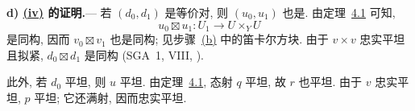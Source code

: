 \medskip
{}\label{par:sga3-V-6-d}%
\noindent\textbf{d) \hyperref[lem:sga3-V-6.1-iv]{(iv)} 的证明.}---%
若 \((d_0,d_1)\) 是等价对, 则 \((u_0,u_1)\) 也是.
由定理~\hyperref[thm:sga3-V-4.1]{4.1} 可知,
\[
  u_0\boxtimes u_1:U_1\longrightarrow U\times_Y U
\]
是同构, 因而 \(v_0\boxtimes v_1\) 也是同构;
见步骤~\hyperref[par:sga3-V-6-b]{(b)} 中的笛卡尔方块.
由于 \(v\times v\) 忠实平坦且拟紧,
\(d_0\boxtimes d_1\) 是同构 (SGA~1, VIII, ).

此外, 若 \(d_0\) 平坦, 则 \(u\) 平坦.
由定理~\hyperref[thm:sga3-V-4.1]{4.1}, 态射 \(q\) 平坦, 故 \(r\) 也平坦.
由于 \(v\) 忠实平坦, \(p\) 平坦; 它还满射, 因而忠实平坦.

